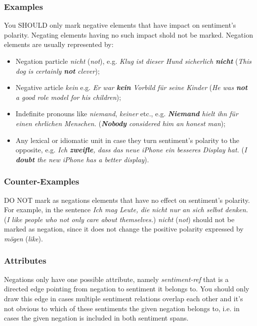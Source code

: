 \documentclass[11pt,a4paper]{article}
\begin{document}
\subsubsection{Examples}
You SHOULD only mark negative elements that have impact on
sentiment's polarity. Negating elements having no such impact
shold not be marked. Negation elements are usually represented by:
\begin{itemize}
\item Negation particle \textit{nicht} (\textit{not}),
  e.g. \textit{Klug ist dieser Hund sicherlich \textbf{nicht}}
  (\textit{This dog is certainly \textbf{not} clever});

\item Negative article \textit{kein} e.g. \textit{Er war
  \textbf{kein} Vorbild f\"ur seine Kinder} (\textit{He was
  \textbf{not} a good role model for his children});

\item Indefinite pronouns like \textit{niemand}, \textit{keiner}
  etc., e.g. \textit{\textbf{Niemand} hielt ihn f\"ur einen
    ehrlichen Menschen.} (\textit{\textbf{Nobody} considered him an
    honest man});

\item Any lexical or idiomatic unit in case they turn sentiment's
  polarity to the opposite, e.g. \textit{Ich \textbf{zweifle}, dass
    das neue iPhone ein besseres Display hat.} (\textit{I
    \textbf{doubt} the new iPhone has a better display}).
\end{itemize}

\subsubsection{Counter-Examples}
DO NOT mark as negations elements that have no effect on sentiment's
polarity. For example, in the sentence \textit{Ich mag Leute, die nicht
  nur an sich selbst denken.} (\textit{I like people who not only care
  about themselves.}) \textit{nicht} (\textit{not}) should not be
marked as negation, since it does not change the positive polarity
expressed by \textit{m\"ogen} (\textit{like}).

\subsubsection{Attributes}
Negations only have one possible attribute, namely
\textit{sentiment-ref} that is a directed edge pointing from negation
to sentiment it belongs to. You should only draw this edge in cases multiple sentiment relations overlap each other and it's not
obvious to which of these sentiments the given negation belongs to,
i.e. in cases the given negation is included in both sentiment spans.
\end{document}
